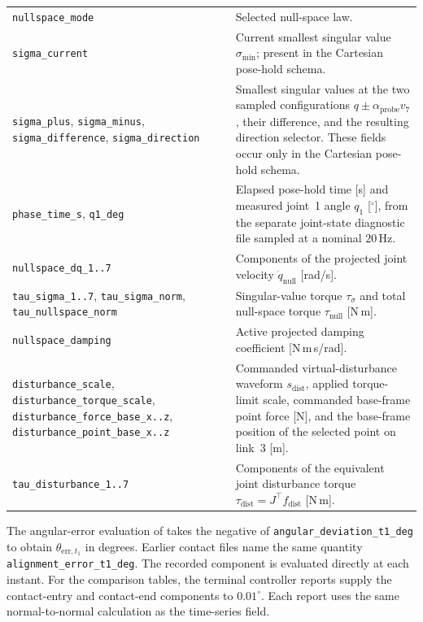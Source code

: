 \begin{longtable}{@{}p{}p{}@{}}
\texttt{nullspace\_mode} &
Selected null-space law.\\
\texttt{sigma\_current} &
Current smallest singular value \(\sigma_{\min}\); present in the Cartesian
pose-hold schema.\\
\texttt{sigma\_plus}, \texttt{sigma\_minus},\newline
\texttt{sigma\_difference}, \texttt{sigma\_direction} &
Smallest singular values at the two sampled configurations
\(q\pm\alpha_{\mathrm{probe}}v_7\), their difference, and the resulting
direction selector. These fields occur only in the Cartesian pose-hold
schema.\\
\texttt{phase\_time\_s}, \texttt{q1\_deg} &
Elapsed pose-hold time [s] and measured joint~1 angle
\(q_1\) [${}^\circ$], from the separate joint-state diagnostic file
sampled at a nominal \(20\,\mathrm{Hz}\).\\
\texttt{nullspace\_dq\_1..7} &
Components of the projected joint velocity \(\dot q_{\mathrm{null}}\)
[rad/s].\\
\texttt{tau\_sigma\_1..7}, \texttt{tau\_sigma\_norm},
\texttt{tau\_nullspace\_norm} &
Singular-value torque \(\tau_\sigma\) and total null-space torque
\(\tau_{\mathrm{null}}\) [N\,m].\\
\texttt{nullspace\_damping} &
Active projected damping coefficient [N\,m\,s/rad].\\
\texttt{disturbance\_scale},\newline
{\small\texttt{disturbance\_torque\_scale}},\newline
\texttt{disturbance\_force\_}\newline\texttt{base\_x..z},
\texttt{disturbance\_}\newline\texttt{point\_base\_x..z} &
Commanded virtual-disturbance waveform \(s_{\mathrm{dist}}\), applied
torque-limit scale, commanded base-frame point force [N], and the base-frame
position of the selected point on link~3 [m].\\
\texttt{tau\_disturbance\_1..7} &
Components of the equivalent joint disturbance torque
\(\tau_{\mathrm{dist}}=J^\top f_{\mathrm{dist}}\) [N\,m].\\
\end{longtable}

The angular-error evaluation of
\mbox{} takes the negative of
\texttt{angular\_\allowbreak deviation\_\allowbreak t1\_\allowbreak deg} to obtain
\mbox{\(\theta_{\mathrm{err},t_1}\)} in degrees. Earlier contact files name the
same quantity \texttt{alignment\_\allowbreak error\_\allowbreak t1\_\allowbreak deg}.
The recorded component is evaluated directly at each instant.
For the comparison tables, the terminal controller reports supply the
contact-entry and contact-end components to \mbox{\(0.01^\circ\)}.
Each report uses the same normal-to-normal calculation as the time-series field.

